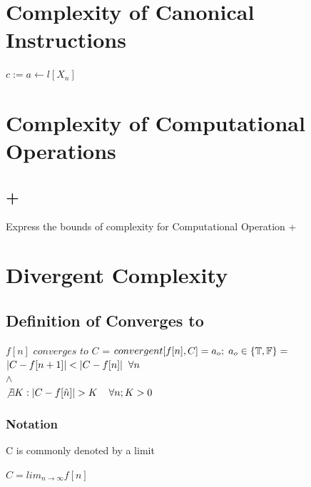 \documentclass[11pt]{article}
\begin{document}
\section{Complexity of Canonical Instructions}
\begin{center}
$
c := a \leftarrow l[X_n]
$
\end{center}

\section{Complexity of Computational Operations}
\subsection{+}
Express the bounds of complexity for Computational Operation +



\section{Divergent Complexity}

\subsection{Definition of Converges to}
\begin{center}
\vspace{1mm}
$f[n]$ $converges$ $to$ $C$ = $convergent [f [n],C] = a_o; \hspace{1mm} a_o \in \{\mathbb{T},\mathbb{F}\} =$
\\ \vspace{6mm}
$
|C - f[n+1]| < |C - f[n]| \hspace{2mm} \forall n
$
\\ \vspace{2mm}
$
\land
$
\\ \vspace{2mm}
$
\not \exists K : | C - f[\hat{n}] | > K \hspace{4mm} \forall n; K > 0
$
\end{center}

\subsubsection{Notation}
C is commonly denoted by a limit
\begin{center}
$
C = lim_{n \rightarrow \infty} f[n]
$
\end{center}
\end{document}
